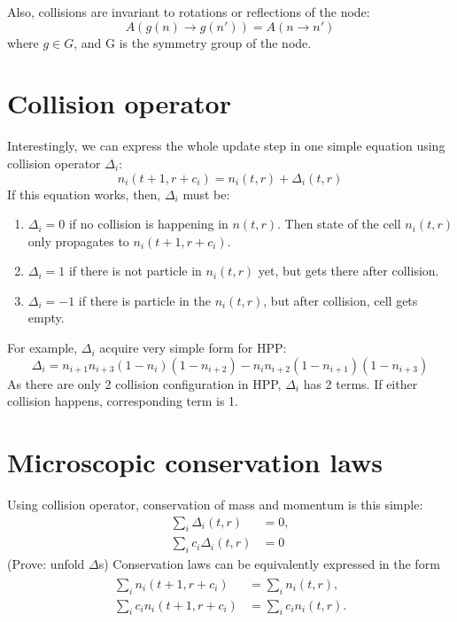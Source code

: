 Also, collisions are invariant to rotations or reflections of the node:
\begin{equation}
A(g(n) \rightarrow g(n')) = A(n \rightarrow n')
\end{equation}
where $g \in G$, and G is the symmetry group of the node.

\section{Collision operator}
Interestingly, we can express the whole update step in one simple equation using collision operator $\Delta_i$:
\begin{equation}
n_i(t+1,r+c_i) = n_i(t,r) + \Delta_i(t,r)
\end{equation}
If this equation works, then, $\Delta_i$ must be:
\begin{enumerate}
\item $\Delta_i = 0$ if no collision is happening in $n(t,r)$. Then state of the cell $n_i(t,r)$ only propagates to $n_i(t+1,r+c_i)$.
\item $\Delta_i = 1$ if there is not particle in $n_i(t,r)$ yet, but gets there after collision. 
 \item $\Delta_i = -1$ if there is particle in the $n_i(t,r)$, but after collision, cell gets empty.
\end{enumerate}

\bigskip

For example, $\Delta_i$ acquire very simple form for HPP:
\begin{equation}
\Delta_i = n_{i+1} n_{i+3}( 1 - n_i)(1 - n_{i+2}) - n_i n_{i+2}(1-n_{i+1})(1 - n_{i+3})
\end{equation}
As there are only 2 collision configuration in HPP, $\Delta_i$ has 2 terms.
If either collision happens, corresponding term is 1.

\section{Microscopic conservation laws}
Using collision operator, conservation of mass and momentum is this simple:
\begin{subequations}
\begin{align}
\sum_i \Delta_i(t,r) &= 0,\\
%
\sum_i c_i \Delta_i(t,r) &= 0
\end{align}
\end{subequations}
(Prove: unfold $\Delta$s)
Conservation laws can be equivalently expressed in the form
\begin{align} \label{cons1}
\begin{split}
\sum_i n_i(t+1, r + c_i) &= \sum_i n_i(t,r), \\
\sum_i c_i n_i(t+1, r + c_i) &= \sum_i c_i n_i(t,r).
\end{split}
\end{align}

